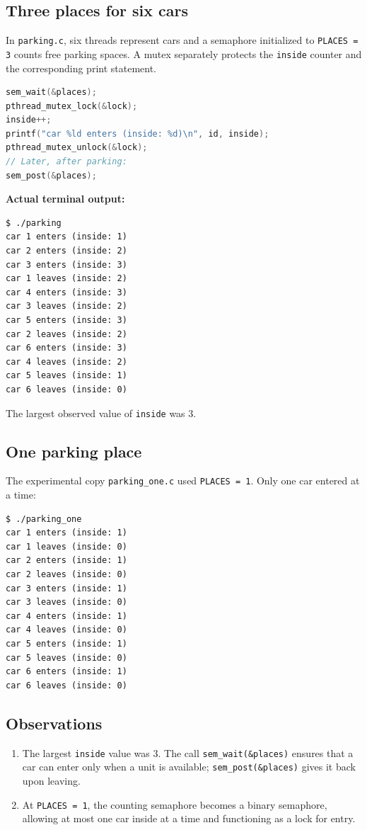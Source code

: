 \documentclass[12pt,a4paper]{article}
\begin{document}
\subsection{Three places for six cars}
In \texttt{parking.c}, six threads represent cars and a semaphore initialized to \texttt{PLACES = 3} counts free parking spaces. A mutex separately protects the \texttt{inside} counter and the corresponding print statement.
\begin{lstlisting}[language=C]
sem_wait(&places);
pthread_mutex_lock(&lock);
inside++;
printf("car %ld enters (inside: %d)\n", id, inside);
pthread_mutex_unlock(&lock);
// Later, after parking:
sem_post(&places);
\end{lstlisting}
\noindent\textbf{Actual terminal output:}
\begin{lstlisting}
$ ./parking
car 1 enters (inside: 1)
car 2 enters (inside: 2)
car 3 enters (inside: 3)
car 1 leaves (inside: 2)
car 4 enters (inside: 3)
car 3 leaves (inside: 2)
car 5 enters (inside: 3)
car 2 leaves (inside: 2)
car 6 enters (inside: 3)
car 4 leaves (inside: 2)
car 5 leaves (inside: 1)
car 6 leaves (inside: 0)
\end{lstlisting}
The largest observed value of \texttt{inside} was 3.
\subsection{One parking place}
The experimental copy \texttt{parking\_one.c} used \texttt{PLACES = 1}. Only one car entered at a time:
\begin{lstlisting}
$ ./parking_one
car 1 enters (inside: 1)
car 1 leaves (inside: 0)
car 2 enters (inside: 1)
car 2 leaves (inside: 0)
car 3 enters (inside: 1)
car 3 leaves (inside: 0)
car 4 enters (inside: 1)
car 4 leaves (inside: 0)
car 5 enters (inside: 1)
car 5 leaves (inside: 0)
car 6 enters (inside: 1)
car 6 leaves (inside: 0)
\end{lstlisting}
\subsection{Observations}
\begin{enumerate}[label=\arabic*.]
\item The largest \texttt{inside} value was 3. The call \texttt{sem\_wait(\&places)} ensures that a car can enter only when a unit is available; \texttt{sem\_post(\&places)} gives it back upon leaving.
\item At \texttt{PLACES = 1}, the counting semaphore becomes a binary semaphore, allowing at most one car inside at a time and functioning as a lock for entry.
\end{enumerate}
\end{document}
